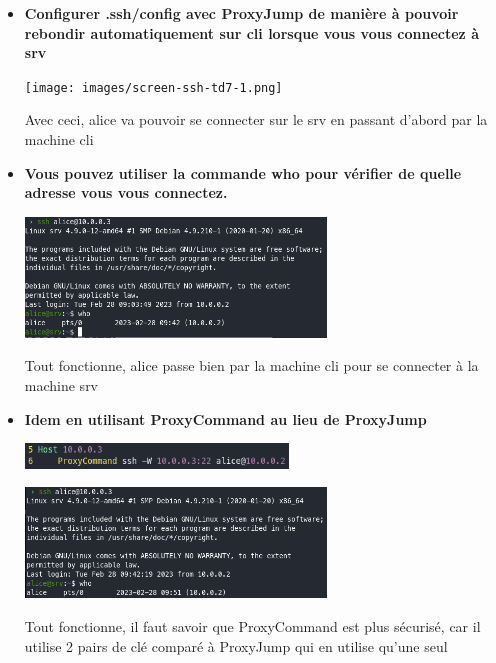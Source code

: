 \documentclass[12pt]{article}
\begin{document}
\begin{itemize}
  \item \textbf{Configurer .ssh/config avec ProxyJump de manière à pouvoir rebondir automatiquement sur cli lorsque
  vous vous connectez à srv}
  \vspace{0.3cm}

  \texttt{[image: images/screen-ssh-td7-1.png]}
  \vspace{0.3cm}

  Avec ceci, alice va pouvoir se connecter sur le srv en passant d'abord par la machine cli
\end{itemize}
\vspace{0.3cm}

\begin{itemize}
  \item \textbf{Vous pouvez utiliser la commande who pour vérifier de quelle adresse vous vous connectez.}
  \vspace{0.3cm}

  \includegraphics[width=8cm]{images/screen-ssh-td7-2.png}
  \vspace{0.3cm}

  Tout fonctionne, alice passe bien par la machine cli pour se connecter à la machine srv
\end{itemize}
\vspace{0.3cm}

\begin{itemize}
  \item \textbf{Idem en utilisant ProxyCommand au lieu de ProxyJump}
  \vspace{0.3cm}

  \includegraphics[width=7cm]{images/screen-ssh-td7-3.png}
  \vspace{0.3cm}

  \includegraphics[width=8cm]{images/screen-ssh-td7-4.png}
  \vspace{0.3cm}

  Tout fonctionne, il faut savoir que ProxyCommand est plus sécurisé, car il utilise 2 pairs de clé comparé à ProxyJump
  qui en utilise qu'une seul
\end{itemize}
\vspace{0.3cm}
\end{document}
